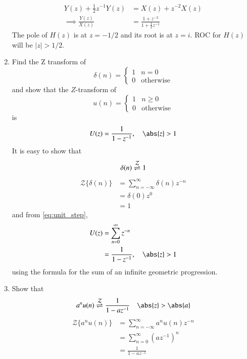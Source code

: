 \documentclass[journal,12pt,twocolumn]{IEEEtran}
\renewcommand\thesection{\arabic{section}}
\begin{document}
\begin{enumerate}[label=\thesection.\arabic*]
\begin{align}
Y(z) + \frac{1}{2}z^{-1}Y(z) &= X(z)+z^{-2}X(z)
\\
\implies \frac{Y(z)}{X(z)} &= \frac{1 + z^{-2}}{1 + \frac{1}{2}z^{-1}}
\label{eq:freq_resp}
\end{align}
The pole of $H(z)$ is at $z=-1/2$ and its root  is at $z=i$. ROC for $H(z)$ will be $|z|>1/2$.
%
\item Find the Z transform of 
\begin{equation}
\delta(n)
=
\begin{cases}
1 & n = 0
\\
0 & \text{otherwise}
\end{cases}
\end{equation}
and show that the $Z$-transform of
\begin{equation}
\label{eq:unit_step}
u(n)
=
\begin{cases}
1 & n \ge 0
\\
0 & \text{otherwise}
\end{cases}
\end{equation}
is
\begin{equation}
U(z) = \frac{1}{1-z^{-1}}, \quad \abs{z} > 1
\end{equation}
\solution It is easy to show that
\begin{equation}\label{eq:z_trans_constant}
\delta(n) \overset{\mathcal{Z}}{ \rightleftharpoons} 1
\end{equation}
\begin{align}
    \mathcal {Z}\{\delta(n)\} &=\sum _{n=-\infty }^{\infty }\delta(n)z^{-n}\\
    &= \delta(0)z^0\\
    &=1
\end{align}
and from \eqref{eq:unit_step},
\begin{align}
U(z) &= \sum _{n= 0}^{\infty}z^{-n}
\\
&=\frac{1}{1-z^{-1}}, \quad \abs{z} > 1
\end{align}
using the formula for the sum of an infinite geometric progression.
%
\item Show that 
\begin{equation}
\label{eq:anun}
a^nu(n) \ztrans \frac{1}{1-az^{-1}} \quad \abs{z} > \abs{a}
\end{equation}
\solution
\begin{align}
    \mathcal{Z}\{a^nu(n)\} &= \sum_{n=-\infty}^{\infty} a^nu(n)z^{-n}\\
    &= \sum_{n=0}^{\infty} (az^{-1})^{n}\\
    &= \frac{1}{1-az^{-1}}\label{eq:z_trans_u}

\end{align}
\end{enumerate}
\end{document}
